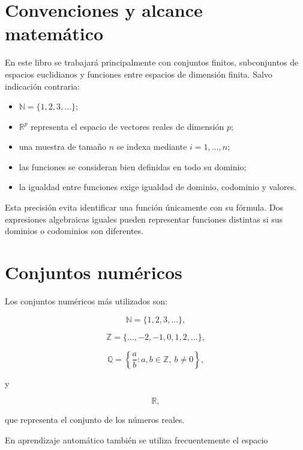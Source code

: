 \documentclass[
  spanish,
  10.5pt,
  letterpaper,
  DIV=11,
  numbers=noendperiod,
  oneside,
  open=any]{scrreprt}
\providecommand{\tightlist}{%
  \setlength{\itemsep}{0pt}\setlength{\parskip}{0pt}}
\theoremstyle{definition}
\theoremstyle{definition}
\theoremstyle{plain}
\theoremstyle{remark}
\begin{document}
\section*{Convenciones y alcance
matemático}\label{convenciones-y-alcance-matemuxe1tico}


En este libro se trabajará principalmente con conjuntos finitos,
subconjuntos de espacios euclidianos y funciones entre espacios de
dimensión finita. Salvo indicación contraria:

\begin{itemize}
\tightlist
\item
  \(\mathbb{N}=\{1,2,3,\ldots\}\);
\item
  \(\mathbb{R}^{p}\) representa el espacio de vectores reales de
  dimensión \(p\);
\item
  una muestra de tamaño \(n\) se indexa mediante \(i=1,\ldots,n\);
\item
  las funciones se consideran bien definidas en todo su dominio;
\item
  la igualdad entre funciones exige igualdad de dominio, codominio y
  valores.
\end{itemize}

Esta precisión evita identificar una función únicamente con su fórmula.
Dos expresiones algebraicas iguales pueden representar funciones
distintas si sus dominios o codominios son diferentes.

\section*{Conjuntos numéricos}\label{conjuntos-numuxe9ricos}


Los conjuntos numéricos más utilizados son:

\[
\mathbb{N}=\{1,2,3,\ldots\},
\]

\[
\mathbb{Z}=\{\ldots,-2,-1,0,1,2,\ldots\},
\]

\[
\mathbb{Q}
=
\left\{
\frac{a}{b}:a,b\in\mathbb{Z},\ b\neq 0
\right\},
\]

y

\[
\mathbb{R},
\]

que representa el conjunto de los números reales.

En aprendizaje automático también se utiliza frecuentemente el espacio
\end{document}

